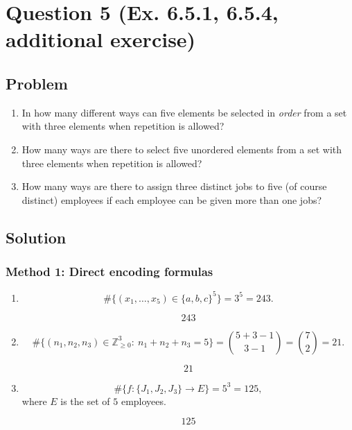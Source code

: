 \documentclass[12pt]{article}
\begin{document}
\newpage

\section{Question 5 (Ex. 6.5.1, 6.5.4, additional exercise)}
\subsection{Problem}
\begin{enumerate}[label=(\alph*)]
\item In how many different ways can five elements be selected in \emph{order} from a set with three elements when repetition is allowed?
\item How many ways are there to select five unordered elements from a set with three elements when repetition is allowed?
\item How many ways are there to assign three distinct jobs to five (of course distinct) employees if each employee can be given more than one jobs?
\end{enumerate}
\vspace{2cm}
\subsection{Solution}


\subsubsection{Method 1: Direct encoding formulas}
\begin{enumerate}[label=(\alph*)]
\item
\[
\#\{(x_1,\dots,x_5)\in\{a,b,c\}^5\}=3^5=243.
\]

\[
\boxed{243}
\]

\item
\[
\#\{(n_1,n_2,n_3)\in\mathbb Z_{\ge0}^3:\ n_1+n_2+n_3=5\}
=\binom{5+3-1}{3-1}
=\binom{7}{2}
=21.
\]

\[
\boxed{21}
\]

\item
\[
\#\{f:\{J_1,J_2,J_3\}\to E\}=5^3=125,
\]
where \(E\) is the set of \(5\) employees.

\[
\boxed{125}
\]
\end{enumerate}

\newpage
\end{document}

